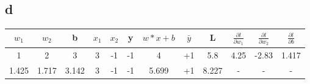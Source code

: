 \documentclass{article}
\begin{document}
\subsection*{d}
\begin{tabular}{| c | c | c | c | c | c | c | c | c | c | c | c |}
\hline
$w_{1}$ & $w_{2}$ & b & $x_{1}$ & $x_{2}$ & y & $w*x + b$ & $\bar{y}$ & L & $\frac{\partial{l}}{\partial{w_{1}}}$ & $\frac{\partial{l}}{\partial{w_{2}}}$ & $\frac{\partial{l}}{\partial{b}}$\\ \hline
1 & 2 & 3 & 3 & -1 & -1 & 4 & +1 & 5.8 & 4.25 & -2.83 & 1.417 \\ \hline
1.425 & 1.717 & 3.142 & 3 & -1 & -1 & 5.699 & +1 & 8.227 & - & - & - \\ \hline
\end{tabular}
\end{document}

